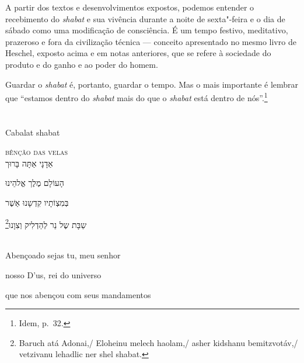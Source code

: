 A partir dos textos e desenvolvimentos expostos, podemos entender
o recebimento do \emph{shabat} e sua vivência durante a noite de sexta"-feira e o dia de sábado como uma modificação de consciência. É um tempo festivo, meditativo, prazeroso e fora da civilização técnica --- conceito apresentado no mesmo livro de Heschel, exposto acima e em notas anteriores, que se refere à sociedade do produto e do ganho e ao poder do homem.

Guardar o \emph{shabat} é, portanto, guardar o tempo. Mas o mais importante é lembrar que ``estamos dentro do \emph{shabat} mais do que o \emph{shabat} está dentro de nós''.\footnote{Idem, p.~32.}


\chapter*{}
\begin{center}
\begin{vplace}[0.3]
\Large
Cabalat shabat
\end{vplace}
\end{center}
\thispagestyle{empty}


\movetoevenpage
\raggedleft

\vspace*{1cm}

\textsc{bênção das velas}\\[15pt]

אַדָנָי אַתָּה בָּרוּך

הָעוֹלָם מֶלֶך אֱלהֵינוּ

בְּמִצְוֹתָיו קִדְשָנוּ אַשֶׁר

שַבָּת שֶל נֵר לְהַדְלִיק וְצִוָנוּ‏\footnote{Baruch atá Adonai,/ Eloheinu melech haolam,/ asher kidshanu bemitzvotáv,/ vetzivanu lehadlic ner shel shabat.}

\movetooddpage
\raggedright

\vspace*{1cm}

\textsc{}\\[15pt]

Abençoado sejas tu, meu senhor

nosso D'us, rei do universo 

que nos abençou com seus mandamentos\label{ref01}

